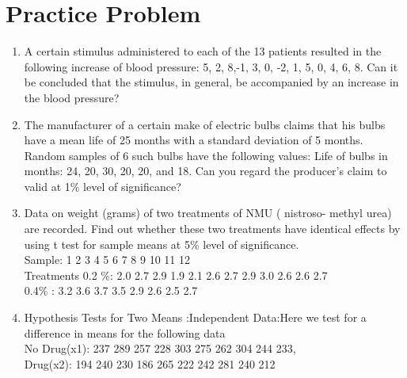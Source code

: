 \documentclass{article}\usepackage[]{graphicx}\usepackage[]{xcolor}
\begin{document}
\section*{Practice Problem}
\begin{enumerate}
  \item A certain stimulus administered to each of the 13 patients resulted in the following increase of
blood pressure: 5, 2, 8,-1, 3, 0, -2, 1, 5, 0, 4, 6, 8. Can it be concluded that the stimulus, in
general, be accompanied by an increase in the blood pressure?
\item The manufacturer of a certain make of electric bulbs claims that his bulbs have a
mean life of 25 months with a standard deviation of 5 months. Random samples of 6
such bulbs have the following values: Life of bulbs in months: 24, 20, 30, 20, 20, and
18. Can you regard the producer’s claim to valid at 1\% level of significance?
\item Data on weight (grams) of two treatments of NMU ( nistroso- methyl urea) are
recorded. Find out whether these two treatments have identical effects by using t test
for sample means at 5\% level of significance.\\
Sample:            1 2 3 4 5 6 7 8 9 10 11 12\\
Treatments 0.2 \%: 2.0 2.7 2.9 1.9 2.1 2.6 2.7 2.9 3.0 2.6 2.6 2.7\\
0.4\% :             3.2 3.6 3.7 3.5 2.9 2.6 2.5 2.7
\item Hypothesis Tests for Two Means :Independent Data:Here we test for a
difference in means for the following data\\
No
Drug(x1):
237 289 257 228 303 275 262 304 244 233, \\
Drug(x2): 194 240 230 186 265 222 242 281 240 212\\
\end{enumerate}
\end{document}
